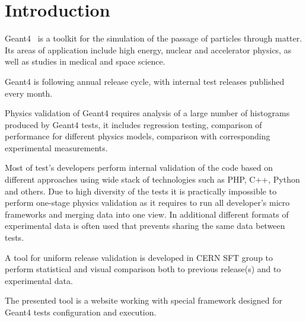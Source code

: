 \section{Introduction}
\label{sec-introduction}
Geant4~\cite{Geant4} is a toolkit for the simulation of the passage of particles through matter. Its areas of application include high energy, nuclear and accelerator physics, as well as studies in medical and space science. 

Geant4 is following annual release cycle, with internal test releases published every month.

Physics validation of Geant4 requires analysis of a large number of histograms produced by Geant4 tests, it includes regression testing, comparison of performance for different physics models, comparison with corresponding experimental measurements. 

Most of test's developers perform internal validation of the code based on different approaches using wide stack of technologies such as PHP, C++, Python and others. Due to high diversity of the tests it is practically impossible to perform one-stage physics validation as it requires to run all developer's micro frameworks and merging data into one view. In additional different formats of experimental data is often used that prevents sharing the same data between tests.

A tool for uniform release validation is developed in CERN SFT group to perform statistical and visual comparison both to previous release(s) and to experimental data. 

The presented tool is a website working with special framework designed for Geant4 tests configuration and execution.
